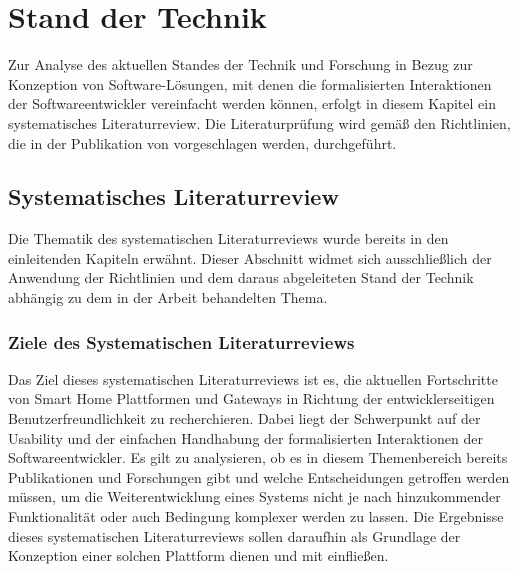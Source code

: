 \chapter{Stand der Technik}
\label{chap:technikStand}
    Zur Analyse des aktuellen Standes der Technik und Forschung in Bezug zur Konzeption von Software-Lösungen, mit denen 
    die formalisierten Interaktionen der Softwareentwickler vereinfacht werden können, erfolgt in diesem 
    Kapitel ein systematisches Literaturreview. Die Literaturprüfung wird gemäß den Richtlinien, die in der Publikation 
    von \cite{Kitchenham2007} vorgeschlagen werden, durchgeführt. 


    \section{Systematisches Literaturreview}
    \label{subsec:systematischesLiteraturReview}
        Die Thematik des systematischen Literaturreviews wurde bereits in den einleitenden Kapiteln erwähnt. 
        Dieser Abschnitt widmet sich ausschließlich der Anwendung der Richtlinien und dem daraus abgeleiteten Stand der Technik 
        abhängig zu dem in der Arbeit behandelten Thema. 

    \subsection{Ziele des Systematischen Literaturreviews}
        Das Ziel dieses systematischen Literaturreviews ist es, die aktuellen Fortschritte von Smart Home Plattformen und 
        Gateways in Richtung der entwicklerseitigen Benutzerfreundlichkeit zu recherchieren. Dabei liegt der Schwerpunkt 
        auf der Usability und der einfachen Handhabung der formalisierten Interaktionen der Softwareentwickler. Es gilt zu 
        analysieren, ob es in diesem Themenbereich bereits Publikationen und Forschungen gibt und welche Entscheidungen 
        getroffen werden müssen, um die Weiterentwicklung eines Systems nicht je nach hinzukommender Funktionalität oder 
        auch Bedingung komplexer werden zu lassen. Die Ergebnisse dieses systematischen Literaturreviews sollen daraufhin 
        als Grundlage der Konzeption einer solchen Plattform dienen und mit einfließen. 

